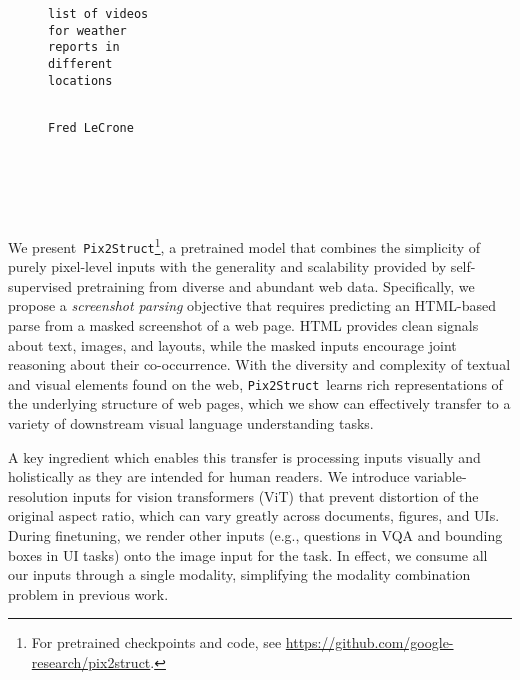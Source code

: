 \documentclass{article} \usepackage[accepted]{icml2023}
\newcommand\ourmodel{{\texttt{Pix2Struct}}}
\begin{document}
\begin{figure*}[!t]
\begin{subfigure}[t]{0.26\textwidth}
\begin{snugshade*}
\begin{verbatim}
\end{verbatim}
\end{snugshade*}
\end{subfigure}
\begin{subfigure}[t]{0.19\textwidth}
\small
\begin{snugshade*}
\begin{verbatim}
list of videos
for weather
reports in
different
locations


\end{verbatim}
\end{snugshade*}
\end{subfigure}
\begin{subfigure}[t]{0.15\textwidth}
\small
\begin{snugshade*}
\begin{verbatim}
Fred LeCrone






\end{verbatim}
\end{snugshade*}
\end{subfigure} \caption{Examples of visually-situated language understanding tasks, including diagram QA (AI2D), app captioning (Screen2Words), and document QA (DocVQA). We also include an example of our proposed pretraining task (screenshot parsing) on the left.~\ourmodel~encodes the pixels from the input image (above) and decodes the output text (below).}
\vspace{-10pt}
\label{fig:tasks}
\end{figure*}

We present~\ourmodel\footnote{For pretrained checkpoints and code, see \url{https://github.com/google-research/pix2struct}.}, a pretrained model that combines the simplicity of purely pixel-level inputs with the generality and scalability provided by self-supervised pretraining from diverse and abundant web data. Specifically, we propose a \emph{screenshot parsing} objective that requires predicting an HTML-based parse from a masked screenshot of a web page. HTML provides clean signals about text, images, and layouts, while the masked inputs encourage joint reasoning about their co-occurrence. With the diversity and complexity of textual and visual elements found on the web, \ourmodel~learns rich representations of the underlying structure of web pages, which we show can effectively transfer to a variety of downstream visual language understanding tasks.

A key ingredient which enables this transfer is processing inputs visually and holistically as they are intended for human readers. We introduce variable-resolution inputs for vision transformers (ViT) that prevent distortion of the original aspect ratio, which can vary greatly across documents, figures, and UIs. During finetuning, we render other inputs (e.g., questions in VQA and bounding boxes in UI tasks) onto the image input for the task. In effect, we consume all our inputs through a single modality, simplifying the modality combination problem in previous work.
\end{document}
